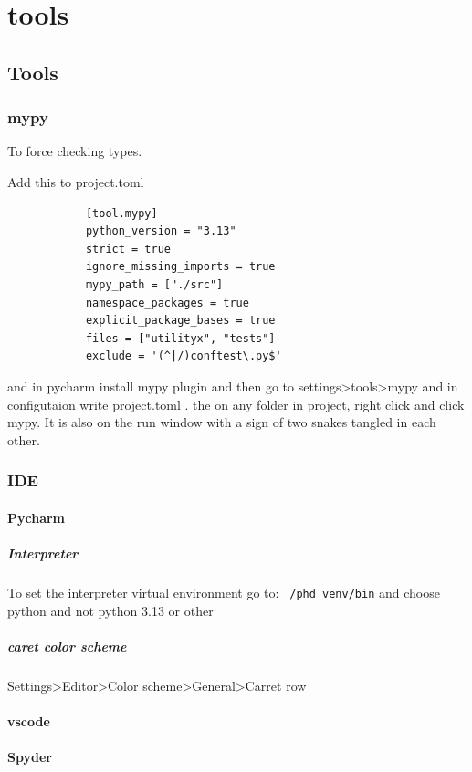 \chapter{tools}
\section{Tools}
    
    \subsection{mypy}
        To force checking types.
        
        Add this to project.toml
        \begin{verbatim}
            [tool.mypy]
            python_version = "3.13"
            strict = true
            ignore_missing_imports = true
            mypy_path = ["./src"]
            namespace_packages = true
            explicit_package_bases = true
            files = ["utilityx", "tests"]
            exclude = '(^|/)conftest\.py$'
        \end{verbatim}
        
        and in pycharm install mypy plugin and then go to settings>tools>mypy and in configutaion write project.toml . the on any folder in project, right click and click mypy. It is also on the run window with a sign of two snakes tangled in each other.
    
    \subsection{IDE}
        
        \subsubsection{Pycharm}
            
            \paragraph{Interpreter} To set the interpreter virtual environment go to: \texttt{~/phd\_venv/bin} and choose python and not python 3.13 or other
            
            \paragraph{caret color scheme}
                Settings>Editor>Color scheme>General>Carret row
        \subsubsection{vscode}
        \subsubsection{Spyder}